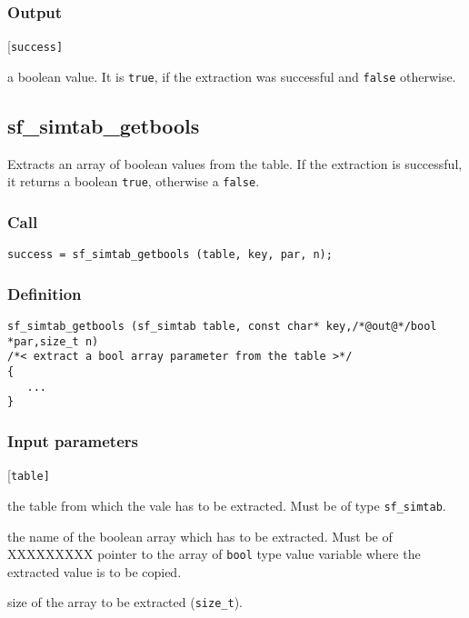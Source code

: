 \subsubsection*{Output}
\begin{desclist}{\tt }{\quad}[\tt success]
   \setlength\itemsep{0pt}
   \item[success] a boolean value. It is \texttt{true}, if the extraction was successful and \texttt{false} otherwise.
\end{desclist}




\subsection{{sf\_simtab\_getbools}}\label{sec:sf_simtab_getbools}
Extracts an array of boolean values from the table. If the extraction is successful, it returns a boolean \texttt{true}, otherwise a \texttt{false}. 

\subsubsection*{Call}
\begin{verbatim}success = sf_simtab_getbools (table, key, par, n);\end{verbatim}

\subsubsection*{Definition}
\begin{verbatim}
sf_simtab_getbools (sf_simtab table, const char* key,/*@out@*/bool *par,size_t n)
/*< extract a bool array parameter from the table >*/
{
   ...
}
\end{verbatim}

\subsubsection*{Input parameters}
\begin{desclist}{\tt }{\quad}[\tt table]
   \setlength\itemsep{0pt}
   \item[table] the table from which the vale has to be extracted. Must be of type \texttt{sf\_simtab}.
   \item[key]   the name of the boolean array which has to be extracted. Must be of XXXXXXXXX  pointer to the array of \texttt{bool} type value variable where the extracted value is to be copied. 
   \item[n]     size of the array to be extracted (\texttt{size\_t}).
\end{desclist}

